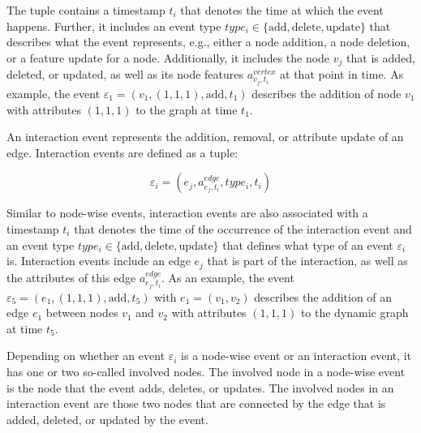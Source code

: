 The tuple contains a timestamp $t_i$ that denotes the time at which the event happens. Further, it includes an event type ${type_{i} \in \{\mathrm{add}, \mathrm{delete}, \mathrm{update}\}}$ that describes what the event represents, e.g., either a node addition, a node deletion, or a feature update for a node. Additionally, it includes the node $v_j$ that is added, deleted, or updated, as well as its node features $a^{vertex}_{v_j, t_i}$ at that point in time. As example, the event $\varepsilon_1 = (v_1, (1,1,1), \mathrm{add}, t_1)$ describes the addition of node $v_1$ with attributes $(1,1,1)$ to the graph at time $t_1$.

An interaction event represents the addition, removal, or attribute update of an edge. Interaction events are defined as a tuple:

\begin{equation}
    \varepsilon_{i} = (e_j, a^{edge}_{e_j, t_i}, type_{i}, t_i)
\end{equation}

Similar to node-wise events, interaction events are also associated with a timestamp $t_i$ that denotes the time of the occurrence of the interaction event and an event type ${type_{i} \in \{\mathrm{add}, \mathrm{delete}, \mathrm{update}\}}$ that defines what type of an event $\varepsilon_i$ is. Interaction events include an edge $e_j$ that is part of the interaction, as well as the attributes of this edge $a^{edge}_{e_j, t_i}$. As an example, the event $\varepsilon_5 = (e_1, (1,1,1), \mathrm{add}, t_5)$ with $e_1 = (v_1, v_2)$ describes the addition of an edge $e_1$ between nodes $v_1$ and $v_2$ with attributes $(1,1,1)$ to the dynamic graph at time $t_5$.

Depending on whether an event $\varepsilon_i$ is a node-wise event or an interaction event, it has one or two so-called involved nodes. The involved node in a node-wise event is the node that the event adds, deletes, or updates. The involved nodes in an interaction event are those two nodes that are connected by the edge that is added, deleted, or updated by the event. 

